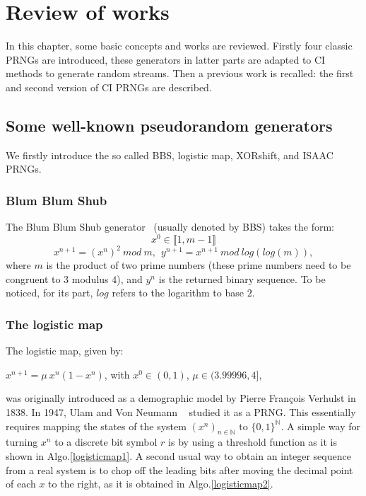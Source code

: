 \chapter{Review of works}
\label{Review of works}
\minitoc

In this chapter, some basic concepts and works are reviewed. Firstly four classic PRNGs are introduced, these generators in latter parts are adapted to CI methods to generate random streams. Then a previous work is recalled: the first and second version of CI PRNGs \cite{bibtexwangqianxue} are described.

\section{Some well-known pseudorandom generators}
\label{The generation of pseudorandom sequence}
We firstly introduce the so called BBS, logistic map, XORshift, and ISAAC PRNGs.

\subsection{Blum Blum Shub}
The Blum Blum Shub generator~\cite{BBS} (usually denoted by BBS) takes the form:\\
$$x^0 \in \llbracket 1, m-1 \rrbracket$$
$$x^{n+1}=\left(x^n\right)^2~ mod~ m, ~~ y^{n+1} = x^{n+1}~ mod~ log(log(m)),$$  
where $m$ is the product of  two prime numbers (these prime numbers  need to be congruent to $3$ modulus $4$), and $y^n$ is the returned 
binary sequence. To be noticed, for its part, $log$ refers to the logarithm to base $2$.

\subsection{The logistic map}

The logistic map, given by:
\begin{center}
$x^{n+1}=\mu ~ x^{n}(1-x^{n})$, with $x^{0}\in(0,1)$, $\mu \in(3.99996,4]$,
\end{center}

\noindent was originally introduced as a demographic model by Pierre Fran\c cois Verhulst in 1838. In 1947, Ulam and Von Neumann ~\cite{ulam1947} studied it as a PRNG. This essentially requires mapping the states of the system $\left(x^n\right)_{n \in \mathds{N}}$ to $\{0,1\}^\mathds{N}$. A simple way for turning $x^n$ to a discrete bit symbol $r$ is by using a threshold function as it is shown in Algo.\ref{logisticmap1}.
A second usual way to obtain an integer sequence from a real system is to chop off the leading bits after moving the decimal point of each $x$ to the right, as it is obtained in Algo.\ref{logisticmap2}.

